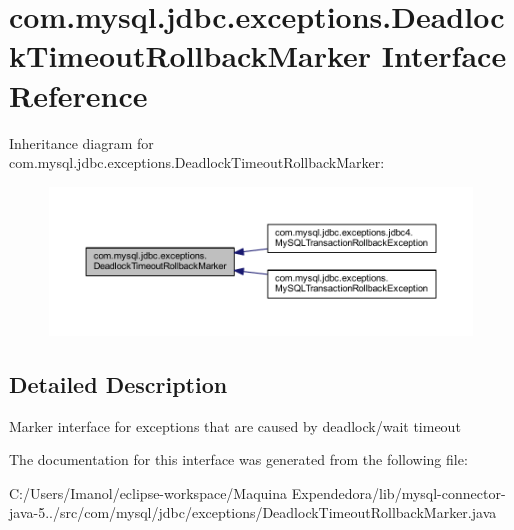 \hypertarget{interfacecom_1_1mysql_1_1jdbc_1_1exceptions_1_1_deadlock_timeout_rollback_marker}{}\section{com.\+mysql.\+jdbc.\+exceptions.\+Deadlock\+Timeout\+Rollback\+Marker Interface Reference}
\label{interfacecom_1_1mysql_1_1jdbc_1_1exceptions_1_1_deadlock_timeout_rollback_marker}


Inheritance diagram for com.\+mysql.\+jdbc.\+exceptions.\+Deadlock\+Timeout\+Rollback\+Marker\+:
\nopagebreak
\begin{figure}[H]
\begin{center}
\leavevmode
\includegraphics[width=350pt]{interfacecom_1_1mysql_1_1jdbc_1_1exceptions_1_1_deadlock_timeout_rollback_marker__inherit__graph}
\end{center}
\end{figure}


\subsection{Detailed Description}
Marker interface for exceptions that are caused by deadlock/wait timeout 

The documentation for this interface was generated from the following file\+:\begin{DoxyCompactItemize}
\item 
C\+:/\+Users/\+Imanol/eclipse-\/workspace/\+Maquina Expendedora/lib/mysql-\/connector-\/java-\/5../src/com/mysql/jdbc/exceptions/Deadlock\+Timeout\+Rollback\+Marker.\+java\end{DoxyCompactItemize}
